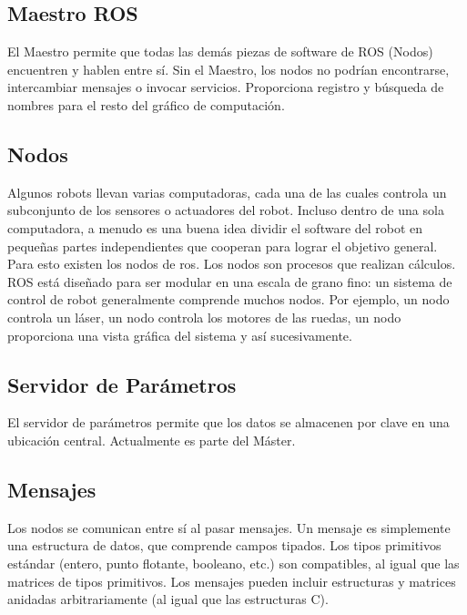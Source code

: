 \subsection{Maestro ROS}
El Maestro permite que todas las demás piezas de software de ROS (Nodos) encuentren y hablen entre sí. Sin el Maestro, los nodos no podrían encontrarse, intercambiar mensajes o invocar servicios. Proporciona registro y búsqueda de nombres para el resto del gráfico de computación.

\subsection{Nodos}
Algunos robots llevan varias computadoras, cada una de las cuales controla un subconjunto de los sensores o actuadores del robot. Incluso dentro de una sola computadora, a menudo es una buena idea dividir el software del robot en pequeñas partes independientes que cooperan para lograr el objetivo general. Para esto existen los nodos de ros.
Los nodos son procesos que realizan cálculos. ROS está diseñado para ser modular en una escala de grano fino: un sistema de control de robot generalmente comprende muchos nodos.
Por ejemplo, un nodo controla un láser, un nodo controla los motores de las ruedas, un nodo proporciona una vista gráfica del sistema y así sucesivamente.

\subsection{Servidor de Parámetros}
El servidor de parámetros permite que los datos se almacenen por clave en una ubicación central. Actualmente es parte del Máster.

\subsection{Mensajes}
Los nodos se comunican entre sí al pasar mensajes. Un mensaje es simplemente una estructura de datos, que comprende campos tipados. Los tipos primitivos estándar (entero, punto flotante, booleano, etc.) son compatibles, al igual que las matrices de tipos primitivos. Los mensajes pueden incluir estructuras y matrices anidadas arbitrariamente (al igual que las estructuras C).

